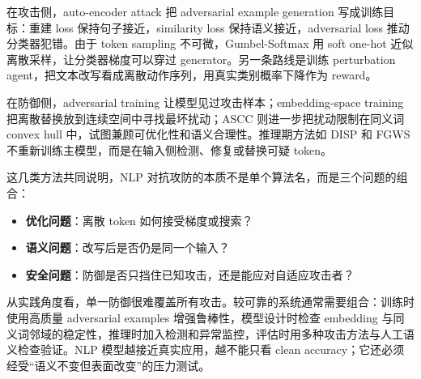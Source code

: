 \documentclass[a4paper]{article}
\begin{document}
在攻击侧，auto-encoder attack 把 adversarial example generation 写成训练目标：重建 loss 保持句子接近，similarity loss 保持语义接近，adversarial loss 推动分类器犯错。由于 token sampling 不可微，Gumbel-Softmax 用 soft one-hot 近似离散采样，让分类器梯度可以穿过 generator。另一条路线是训练 perturbation agent，把文本改写看成离散动作序列，用真实类别概率下降作为 reward。

在防御侧，adversarial training 让模型见过攻击样本；embedding-space training 把离散替换放到连续空间中寻找最坏扰动；ASCC 则进一步把扰动限制在同义词 convex hull 中，试图兼顾可优化性和语义合理性。推理期方法如 DISP 和 FGWS 不重新训练主模型，而是在输入侧检测、修复或替换可疑 token。

这几类方法共同说明，NLP 对抗攻防的本质不是单个算法名，而是三个问题的组合：

\begin{itemize}
    \item \textbf{优化问题}：离散 token 如何接受梯度或搜索？
    \item \textbf{语义问题}：改写后是否仍是同一个输入？
    \item \textbf{安全问题}：防御是否只挡住已知攻击，还是能应对自适应攻击者？
\end{itemize}

从实践角度看，单一防御很难覆盖所有攻击。较可靠的系统通常需要组合：训练时使用高质量 adversarial examples 增强鲁棒性，模型设计时检查 embedding 与同义词邻域的稳定性，推理时加入检测和异常监控，评估时用多种攻击方法与人工语义检查验证。NLP 模型越接近真实应用，越不能只看 clean accuracy；它还必须经受“语义不变但表面改变”的压力测试。
\end{document}
